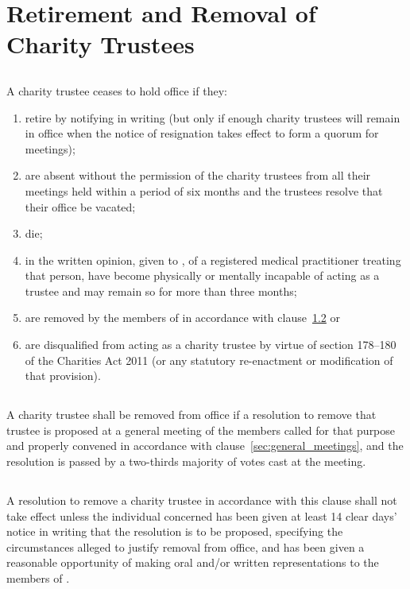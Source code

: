 \section{Retirement and Removal of Charity Trustees}\label{sec:retirement_removal}

    \subsection{}\label{sec:retirement}
    A charity trustee ceases to hold office if they:
    \begin{enumerate}
        \item retire by notifying \shortname{} in writing (but only if enough charity trustees will remain in office when the notice of resignation takes effect to form a quorum for meetings);
        \item are absent without the permission of the charity trustees from all their meetings held within a period of six months and the trustees resolve that their office be vacated;
        \item die;
        \item in the written opinion, given to \shortname{}, of a registered medical practitioner treating that person, have become physically or mentally incapable of acting as a trustee and may remain so for more than three months;
        \item are removed by the members of \shortname{} in accordance with clause~\ref{sec:removal} or
        \item\label{item:trustee_disqualification} are disqualified from acting as a charity trustee by virtue of section 178--180 of the Charities Act 2011 (or any statutory re-enactment or modification of that provision).
    \end{enumerate}

    \subsection{}\label{sec:removal}
    A charity trustee shall be removed from office if a resolution to remove that trustee is proposed at a general meeting of the members called for that purpose and properly convened in accordance with clause~\ref{sec:general_meetings}, and the resolution is passed by a two-thirds majority of votes cast at the meeting.

    \subsection{}
    A resolution to remove a charity trustee in accordance with this clause shall not take effect unless the individual concerned has been given at least 14 clear days' notice in writing that the resolution is to be proposed, specifying the circumstances alleged to justify removal from office, and has been given a reasonable opportunity of making oral and/or written representations to the members of \shortname{}.
